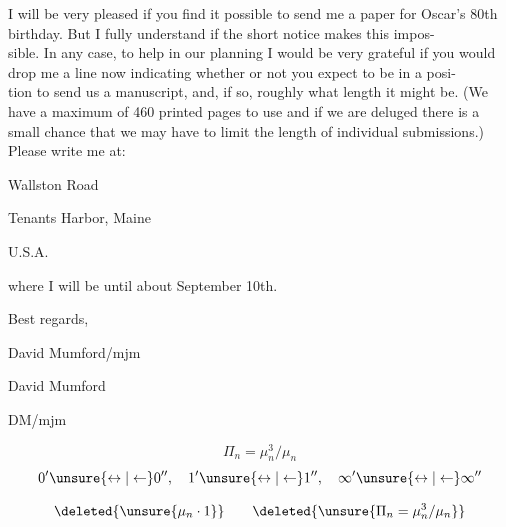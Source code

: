 I will be very pleased if you find it possible to send me a paper for Oscar's
80th birthday. But I fully understand if the short notice makes this impos-\\
sible. In any case, to help in our planning I would be very grateful if you
would drop me a line now indicating whether or not you expect to be in a posi-\\
tion to send us a manuscript, and, if so, roughly what length it might be.
(We have a maximum of 460 printed pages to use and if we are deluged there is
a small chance that we may have to limit the length of individual submissions.)
Please write me at:

Wallston Road

Tenants Harbor, Maine

U.S.A.

where I will be until about September 10th.

Best regards,

David Mumford/mjm

David Mumford

DM/mjm

\[
\Pi_n=\mu_n^3/\mu_n
\]
\[
0'\unsure{\leftrightarrow|\leftarrow}0'',\quad
1'\unsure{\leftrightarrow|\leftarrow}1'',\quad
\infty'\unsure{\leftrightarrow|\leftarrow}\infty''
\]

\[
\deleted{\unsure{\mu_n\cdot1}}\qquad
\deleted{\unsure{\Pi_n=\mu_n^3/\mu_n}}
\]

